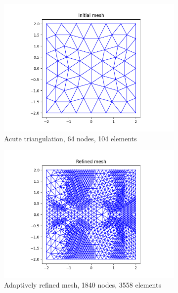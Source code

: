 \documentclass[11pt]{article}
\begin{document}
\newpage

\begin{figure}
  \centering
  \begin{subfigure}[b]{0.45\textwidth}
    \includegraphics[scale=0.6]{grid.png}
    \caption{Acute triangulation, 64 nodes, 104 elements}
  \end{subfigure}
  \begin{subfigure}[b]{0.45\textwidth}
    \includegraphics[scale=0.6]{grid_refined.png}
    \caption{Adaptively refined mesh, 1840 nodes, 3558 elements}
  \end{subfigure}
  \begin{subfigure}[b]{0.45\textwidth}

\end{subfigure}
\end{figure}
\end{document}
